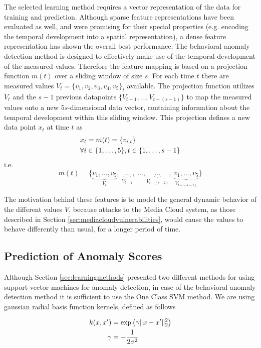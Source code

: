 \documentclass{llncs}
\begin{document}
The selected learning method requires a vector representation of the data for training and prediction. Although sparse feature representations have been evaluated as well, and were promising for their special properties (e.g. encoding the temporal development into a spatial representation), a dense feature representation has shown the overall best performance. The behavioral anomaly detection method is designed to effectively make use of the temporal development of the measured values. Therefore the feature mapping is based on a projection function $m(t)$ over a sliding window of size $s$. For each time $t$ there are measured values $V_t = \{v_1, v_2, v_3, v_4, v_5\}_t$ available. The projection function utilizes $V_t$ and the $s-1$ previous datapoints $\{V_{t-1}, \dots, V_{t-(s-1)}\}$ to map the measured values onto a new $5s$-dimensional data vector, containing information about the temporal development within this sliding window. This projection defines a new data point $x_t$ at time $t$ as 
\begin{align}
& x_t = m(t) = \{v_{i,t}\} \\
&\forall i \in \{1, \dots, 5\}, t \in \{1, \dots, s-1\} \notag
\end{align}
i.e.
$$
m(t) =\{\underbrace{v_1, \dots , v_5}_{V_t}, \;
\underbrace{\dots}_{V_{t-1}}, \; \dots, \underbrace{\dots}_{V_{t-(s-2)}}, \;
\underbrace{v_1, \dots , v_5}_{V_{t-(s-1)}}\}
$$

The motivation behind these features is to model the general dynamic behavior of the different values $V$, because attacks to the Media Cloud system, as those described in Section \ref{sec:mediacloudvulnerabilities}, would cause the values to behave differently than usual, for a longer period of time.

\subsection{Prediction of Anomaly Scores}
\label{sec:behav_model_and_prediction}
Although Section \ref{sec:learningmethods} presented two different methods for using support vector machines for anomaly detection, in case of the behavioral anomaly detection method it is sufficient to use the One Class SVM method. We are using gaussian radial basis function kernels, defined as follows

\begin{align}
k(x,x') &= \exp \left( \gamma \| x-x' \|^2_2 \right)\\
\notag \gamma &= -\frac{1}{2\sigma^2}
\label{eq:rbfkerndef}
\end{align}
\end{document}
